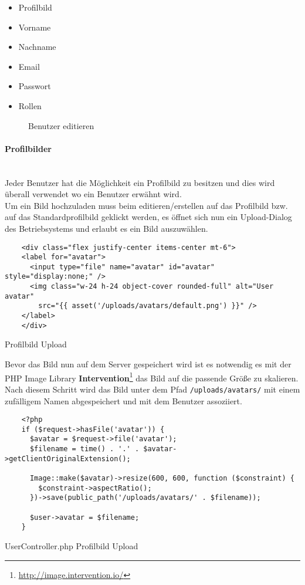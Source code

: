 \begin{itemize}
  \item Profilbild
  \item Vorname
  \item Nachname
  \item Email
  \item Passwort
  \item Rollen
\end{itemize}

\begin{figure}[H]
  \centering
  \caption{Benutzer editieren}
\end{figure}

\paragraph{Profilbilder}\mbox{}\\
Jeder Benutzer hat die Möglichkeit ein Profilbild zu besitzen und dies wird
überall verwendet wo ein Benutzer erwähnt wird.\\

Um ein Bild hochzuladen muss beim editieren/erstellen auf das Profilbild bzw.
auf das Standardprofilbild geklickt werden, es öffnet sich nun ein Upload-Dialog
des Betriebsystems und erlaubt es ein Bild auszuwählen.

\begin{listing}[H]
  \begin{verbatim}
    <div class="flex justify-center items-center mt-6">
    <label for="avatar">
      <input type="file" name="avatar" id="avatar" style="display:none;" />
      <img class="w-24 h-24 object-cover rounded-full" alt="User avatar"
        src="{{ asset('/uploads/avatars/default.png') }}" />
    </label>
    </div>
  \end{verbatim}
  \caption{Profilbild Upload}
\end{listing}

Bevor das Bild nun auf dem Server gespeichert wird ist es notwendig es mit der
PHP Image Library
\textbf{Intervention}\footnote{\url{http://image.intervention.io/}} das Bild auf
die passende Größe zu skalieren. Nach diesem Schritt wird das Bild unter dem
Pfad \verb|/uploads/avatars/| mit einem zufälligem Namen abgespeichert und mit
dem Benutzer assoziiert.

\begin{listing}[H]
  \begin{verbatim}
    <?php
    if ($request->hasFile('avatar')) {
      $avatar = $request->file('avatar');
      $filename = time() . '.' . $avatar->getClientOriginalExtension();

      Image::make($avatar)->resize(600, 600, function ($constraint) {
        $constraint->aspectRatio();
      })->save(public_path('/uploads/avatars/' . $filename));

      $user->avatar = $filename;
    }
  \end{verbatim}
  \caption{UserController.php Profilbild Upload}
\end{listing}

